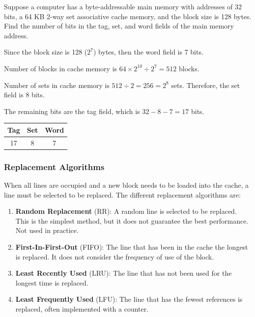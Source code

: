 \begin{example}
    Suppose a computer has a byte-addressable main memory with addresses of 32 bits,
    a 64 KB 2-way set associative cache memory, and the block size is 128 bytes. Find
    the number of bits in the tag, set, and word fields of the main memory address.

    \begin{solution}
    Since the block size is 128 ($2^7$) bytes, then the word field is 7 bits.

    Number of blocks in cache memory is $64 \times 2^{10} \div 2^7 = 512$ blocks.

    Number of sets in cache memory is $512 \div 2 = 256 = 2^8$ sets. Therefore, the set
    field is 8 bits.

    The remaining bits are the tag field, which is $32 - 8 - 7 = 17$ bits.

    \begin{table}[H]
        \centering
        \begin{tabular}{|c|c|c|}
            \hline
            \textbf{Tag} & \textbf{Set} & \textbf{Word} \\ \hline
            17 & 8 & 7 \\ \hline
        \end{tabular}
    \end{table}
    \end{solution}
\end{example}

\subsubsection{Replacement Algorithms}

When all lines are occupied and a new block needs to be loaded into the cache, a line
must be selected to be replaced. The different replacement algorithms are:
\begin{enumerate}
\item \textbf{Random Replacement} (RR): 
    A random line is selected to be replaced. This is the simplest method, but it
    does not guarantee the best performance. Not used in practice.

\item \textbf{First-In-First-Out} (FIFO):
    The line that has been in the cache the longest is replaced. It does not consider
    the frequency of use of the block.

\item \textbf{Least Recently Used} (LRU):
    The line that has not been used for the longest time is replaced.

\item \textbf{Least Frequently Used} (LFU):
    The line that has the fewest references is replaced, often implemented with a counter.
\end{enumerate}

